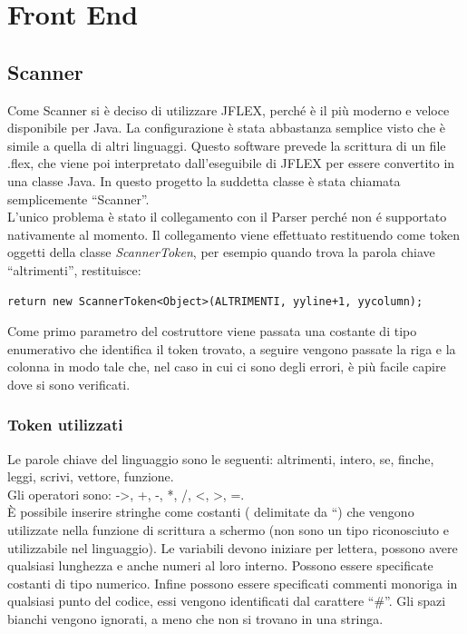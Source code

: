 \documentclass[11pt, a4paper, twoside, notitlepage]{report}
\begin{document}
\onehalfspacing

\setcounter{page}{1}
\setcounter{tocdepth}{3}%
\tableofcontents

\chapter{Front End}

\section{Scanner}
Come Scanner si è deciso di utilizzare JFLEX, perché è il più moderno e veloce
disponibile per Java. La configurazione è stata abbastanza semplice visto che è
simile a quella di altri linguaggi.
Questo software prevede la scrittura di un file .flex, che viene poi
interpretato dall'eseguibile di JFLEX per essere convertito in una classe Java.
In questo progetto la suddetta classe è stata chiamata semplicemente
``Scanner''.
\\L'unico problema è stato il collegamento con il Parser perché non é supportato
nativamente al momento. Il collegamento viene effettuato restituendo come token
oggetti della classe \emph{ScannerToken}, per esempio quando trova la parola
chiave ``altrimenti'', restituisce:
\begin{verbatim}
return new ScannerToken<Object>(ALTRIMENTI, yyline+1, yycolumn);
\end{verbatim}

Come primo parametro del costruttore viene passata una costante di tipo
enumerativo che identifica il token trovato, a seguire vengono passate la riga e
la colonna in modo tale che, nel caso in cui ci sono degli errori, è più facile
capire dove si sono verificati.

\subsection{Token utilizzati}
Le parole chiave del linguaggio sono le seguenti: altrimenti, intero, se,
finche, leggi, scrivi, vettore, funzione.
\\Gli operatori sono: ->, +, -, *, /, <, >, =.
\\È possibile inserire stringhe come costanti ( delimitate da ``) che vengono
utilizzate nella funzione di scrittura a schermo (non sono un tipo riconosciuto e utilizzabile
nel linguaggio). Le variabili devono iniziare per lettera, possono avere
qualsiasi lunghezza e anche numeri al loro interno. Possono essere specificate
costanti di tipo numerico. Infine possono essere specificati commenti monoriga
in qualsiasi punto del codice, essi vengono identificati dal carattere ``#''.
Gli spazi bianchi vengono ignorati, a meno che non si trovano in una stringa.
\end{document}
